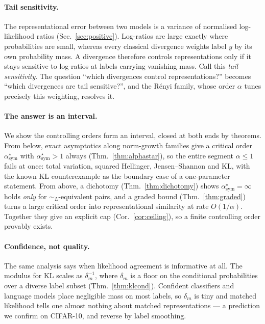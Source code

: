 \documentclass[10pt,letterpaper,twocolumn]{article}
\newcommand{\simL}{\sim_{L}}
\theoremstyle{plain}
\theoremstyle{definition}
\theoremstyle{remark}
\begin{document}
\paragraph{Tail sensitivity.}
The representational error between two models is a variance of normalised
log-likelihood ratios (Sec.~\ref{sec:positive}). Log-ratios are large exactly
where probabilities are small, whereas every classical divergence weights label
$y$ by its own probability mass. A divergence therefore controls
representations only if it stays sensitive to log-ratios at labels carrying
vanishing mass. Call this \emph{tail sensitivity}. The question ``which
divergences control representations?'' becomes ``which divergences are tail
sensitive?'', and the R\'enyi family, whose order $\alpha$ tunes precisely this
weighting, resolves it.

\paragraph{The answer is an interval.}
We show the controlling orders form an interval, closed at both ends by
theorems. From below, exact asymptotics along norm-growth families give a
critical order $\alpha^{\star}_{\mathrm{sym}}$ with
$\alpha^{\star}_{\mathrm{sym}}>1$ always
(Thm.~\ref{thm:alphastar}), so the entire segment $\alpha\le1$ fails at once:
total variation, squared Hellinger, Jensen--Shannon and KL, with the known KL
counterexample as the boundary case of a one-parameter statement. From above, a
dichotomy (Thm.~\ref{thm:dichotomy}) shows
$\alpha^{\star}_{\mathrm{sym}}=\infty$ holds \emph{only} for
$\simL$-equivalent pairs, and a graded bound (Thm.~\ref{thm:graded}) turns a
large critical order into representational similarity at rate $O(1/\alpha)$.
Together they give an explicit cap (Cor.~\ref{cor:ceiling}), so a finite
controlling order provably exists.

\paragraph{Confidence, not quality.}
The same analysis says when likelihood agreement is informative at all. The
modulus for KL scales as $\delta_{m}^{-1}$, where $\delta_{m}$ is a floor on
the conditional probabilities over a diverse label subset
(Thm.~\ref{thm:klcond}). Confident classifiers and language models place
negligible mass on most labels, so $\delta_{m}$ is tiny and matched likelihood
tells one almost nothing about matched representations --- a prediction we
confirm on CIFAR-10, and reverse by label smoothing.
\end{document}
